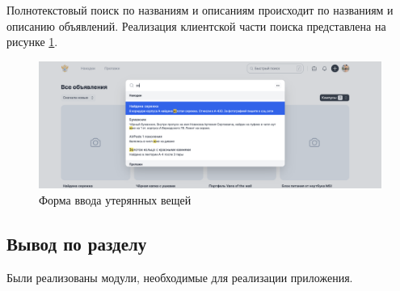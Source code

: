 Полнотекстовый поиск по названиям и описаниям происходит по названиям и описанию объявлений. Реализация клиентской части поиска представлена на рисунке \ref{fig:search-page}.

\begin{figure}[htb]
	\centering
	\includegraphics[width=.95\textwidth]{images/search-page.png}
	\parskip=6pt
	\caption{Форма ввода утерянных вещей}
	\label{fig:search-page}
\end{figure}

\subsection*{Вывод по разделу}

Были реализованы модули, необходимые для реализации приложения.